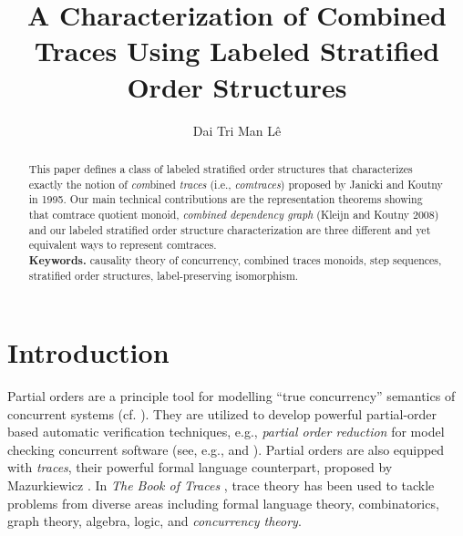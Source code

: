 \documentclass{llncs}
\begin{document}
\newcommand{\secref}[1]{Section~\ref{sec:#1}}
\newcommand{\eqnref}[1]{Eq.~(\ref{eq:#1})}
\newcommand{\TCT}{\stackrel{\mathsf{t}\leftrightsquigarrow \mathsf{c}}{\equiv}}



\newcommand{\EOD}{\hfill {\scriptsize $\blacksquare$}}





\title{A Characterization of Combined Traces Using  Labeled Stratified Order Structures}

\author{Dai Tri Man L\^e}



\maketitle
\pagestyle{headings} 
\begin{abstract}
This paper defines a class of labeled stratified order structures that characterizes exactly the notion of \emph{com}bined \emph{traces} (i.e., \emph{comtraces}) proposed by Janicki and Koutny in 1995. Our main technical contributions are the representation theorems showing that comtrace quotient monoid,  \emph{combined dependency graph} (Kleijn and Koutny 2008) and our labeled stratified order structure characterization are three different and yet equivalent ways to represent comtraces.\\
\textbf{Keywords. } causality theory of concurrency, combined traces monoids, step sequences, stratified order structures, label-preserving isomorphism.
\end{abstract}



\section{Introduction}
Partial orders are a principle tool for modelling ``true concurrency'' semantics of concurrent systems (cf. \cite{Pra}). They are utilized to develop powerful partial-order based automatic verification techniques, e.g.,  \emph{partial order reduction} for model checking concurrent software (see, e.g., \cite[Chapter 10]{CGP} and \cite{EH}). Partial orders are also equipped with \emph{traces}, their powerful formal language counterpart,  proposed by Mazurkiewicz \cite{Ma1}. In  \emph{The Book of Traces} \cite{DR}, trace theory has been used to tackle problems from diverse areas including formal language theory, combinatorics, graph theory, algebra, logic, and \emph{concurrency theory}.
\end{document}
